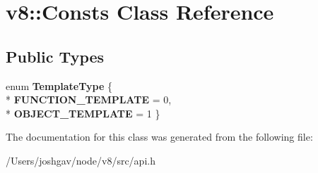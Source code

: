 \hypertarget{classv8_1_1_consts}{}\section{v8\+:\+:Consts Class Reference}
\label{classv8_1_1_consts}
\subsection*{Public Types}
\begin{DoxyCompactItemize}
\item 
enum {\bfseries Template\+Type} \{ \\*
{\bfseries F\+U\+N\+C\+T\+I\+O\+N\+\_\+\+T\+E\+M\+P\+L\+A\+TE} = 0, 
\\*
{\bfseries O\+B\+J\+E\+C\+T\+\_\+\+T\+E\+M\+P\+L\+A\+TE} = 1
 \}\hypertarget{classv8_1_1_consts_afcb83e41645c657b000300603982965c}{}\label{classv8_1_1_consts_afcb83e41645c657b000300603982965c}

\end{DoxyCompactItemize}


The documentation for this class was generated from the following file\+:\begin{DoxyCompactItemize}
\item 
/\+Users/joshgav/node/v8/src/api.\+h\end{DoxyCompactItemize}
